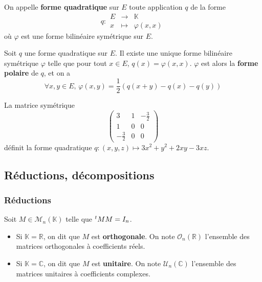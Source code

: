 	\begin{definition}
		On appelle \textbf{forme quadratique} sur $E$ toute application $q$ de la forme
		\[
		q :
		\begin{array}{ccc}
			E &\rightarrow& \mathbb{K} \\
			x &\mapsto& \varphi(x, x)
		\end{array}
		\]
		où $\varphi$ est une forme bilinéaire symétrique sur $E$.
	\end{definition}
	
	\begin{proposition}
		Soit $q$ une forme quadratique sur $E$. Il existe une unique forme bilinéaire symétrique $\varphi$ telle que pour tout $x \in E$, $q(x)=\varphi(x,x)$.
		\newpar
		$\varphi$ est alors la \textbf{forme polaire} de $q$, et on a
		\[ \forall x, y \in E, \, \varphi(x,y) = \frac{1}{2} (q(x+y) - q(x) - q(y)) \]
	\end{proposition}
	
	\begin{example}
		La matrice symétrique
		\[
			\begin{pmatrix}
				3 & 1 & -\frac{3}{2} \\
				1 & 0 & 0 \\
				-\frac{3}{2} & 0 & 0
			\end{pmatrix}
		\]
		définit la forme quadratique $q : (x, y, z) \mapsto 3x^2 + y^2 + 2xy - 3xz$.
	\end{example}
	
	\subsection{Réductions, décompositions}
	
	\subsubsection{Réductions}
	
	
	\begin{definition}
		Soit $M \in \mathcal{M}_n(\mathbb{K})$ telle que $\mathstrut ^t MM = I_n$.
		\begin{itemize}
			\item Si $\mathbb{K} = \mathbb{R}$, on dit que $M$ est \textbf{orthogonale}. On note $\mathcal{O}_n(\mathbb{R})$ l'ensemble des matrices orthogonales à coefficients réels.
			\item Si $\mathbb{K} = \mathbb{C}$, on dit que $M$ est \textbf{unitaire}. On note $\mathcal{U}_n(\mathbb{C})$ l'ensemble des matrices unitaires à coefficients complexes.
		\end{itemize}
	\end{definition}
	
